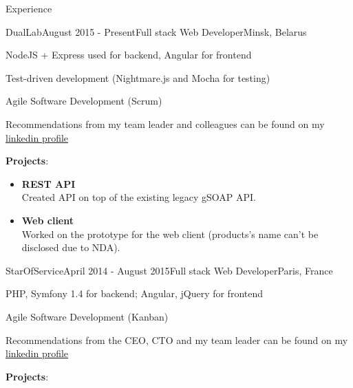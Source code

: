 \documentclass{resume} %
\begin{document}

\begin{rSection}{Experience}

\begin{rSubsection}{DualLab}{August 2015 - Present}{Full stack Web Developer}{Minsk, Belarus}
\item NodeJS + Express used for backend, Angular for frontend 
\item Test-driven development (Nightmare.js and Mocha for testing)
\item Agile Software Development (Scrum)
\item Recommendations from my team leader and colleagues can be found on my \href{http://linkedin.com/in/mikhalchenkoa}{linkedin profile}

{\bf Projects}:

\begin{itemize}[leftmargin=*,label={$+$}]
  \item {\bf REST API} \\
	Created API on top of the existing legacy gSOAP API. 
  \item {\bf Web client} \\
	Worked on the prototype for the web client (products's name can't be disclosed due to NDA).
\end{itemize}

\end{rSubsection}


\begin{rSubsection}{StarOfService}{April 2014 - August 2015}{Full stack Web Developer}{Paris, France}
\item PHP, Symfony 1.4 for backend; Angular, jQuery for frontend
\item Agile Software Development (Kanban)
\item Recommendations from the CEO, CTO and my team leader can be found on my \href{http://linkedin.com/in/mikhalchenkoa}{linkedin profile}

{\bf Projects}:


\end{rSubsection}
\end{rSection}
\end{document}
